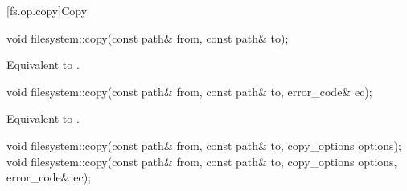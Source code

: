 [fs.op.copy]{Copy}

%
\begin{itemdecl}
void filesystem::copy(const path& from, const path& to);
\end{itemdecl}

\begin{itemdescr}
\pnum
\effects
Equivalent to
.
\end{itemdescr}

%
\begin{itemdecl}
void filesystem::copy(const path& from, const path& to, error_code& ec);
\end{itemdecl}

\begin{itemdescr}
\pnum
\effects
Equivalent to
.
\end{itemdescr}

%
\begin{itemdecl}
void filesystem::copy(const path& from, const path& to, copy_options options);
void filesystem::copy(const path& from, const path& to, copy_options options,
          error_code& ec);
\end{itemdecl}

